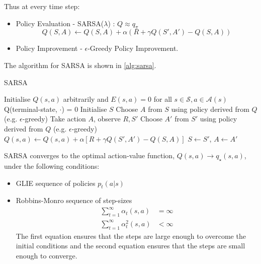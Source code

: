 Thus at every time step:
\begin{itemize}
  \item Policy Evaluation - SARSA(\(\lambda\)) : \(Q \approx q_\pi \)
  \[
    Q(S,A) \leftarrow Q(S,A) + \alpha \left( 
      R + \gamma Q(S', A') - Q(S,A)
    \right) 
  \]
  \item Policy Improvement - \(\epsilon\)-Greedy Policy Improvement.
\end{itemize}
The algorithm for SARSA is shown in \autoref{alg:sarsa}.
\begin{algorithm}[H]
  \caption{SARSA}
  \label{alg:sarsa}
  \begin{algorithmic}[1]
    \State Initialise \(Q(s,a)\) arbitrarily and \(E(s,a) = 0\) for all \(s \in \mathcal{S},
    a \in \mathcal{A}(s)\)
    \State Q(terminal-state, \(\cdot\)) = 0
      \State Initialise \(S\)
      \State Choose \(A\) from \(S\) using policy derived from \(Q\) (e.g.
      \(\epsilon\)-greedy)
        \State Take action \(A\), observe \(R, S'\)
        \State Choose \(A'\) from \(S'\) using policy derived from \(Q\) (e.g.
        \(\epsilon\)-greedy)
        \State \(Q(s,a) \leftarrow Q(s,a) + \alpha \left[ 
          R + \gamma Q(S', A') - Q(S,A)
        \right] \)
        \State \(S \leftarrow S'\), \(A \leftarrow A'\)
      \EndFor
    \EndFor
  \end{algorithmic}
\end{algorithm}

\begin{theorem}
  SARSA converges to the optimal action-value function, \(Q(s,a) \to q_\star(s,a)\), under
  the following conditions:
  \begin{itemize}
    \item GLIE sequence of policies \(p_t(a|s)\) 
    \item Robbins-Monro sequence of step-sizes
    \[
      \begin{aligned}
        \sum_{t=1}^{\infty} \alpha_t(s,a) &= \infty \\
        \sum_{t=1}^{\infty} \alpha_t^2(s,a) &< \infty
      \end{aligned}
    \]
    The first equation ensures that the steps are large enough to overcome the initial
    conditions and the second equation ensures that the steps are small enough to converge.

  \end{itemize}
\end{theorem}
